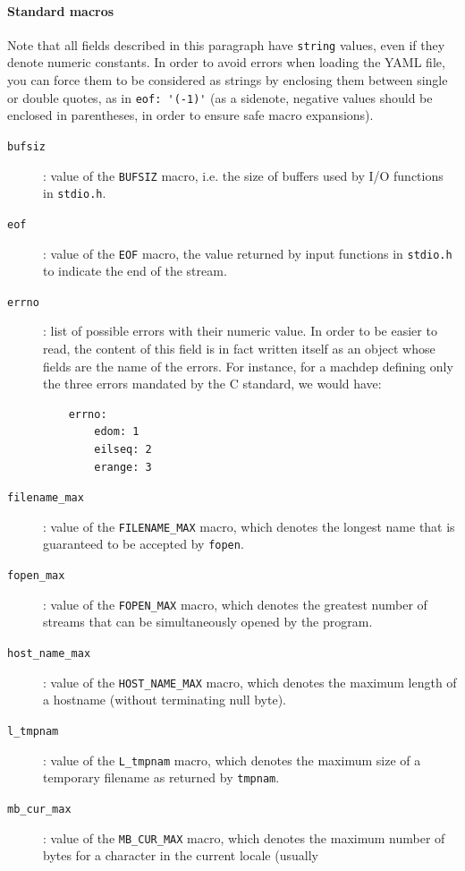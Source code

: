 \paragraph{Standard macros}

Note that all fields described in this paragraph have \texttt{string} values,
even if they denote numeric constants. In order to avoid errors when loading the
YAML file, you can force them to be considered as strings by enclosing them between
single or double quotes, as in \verb+eof: '(-1)'+ (as a sidenote, negative values
should be enclosed in parentheses, in order to ensure safe macro expansions).

\begin{description}
  \item[\texttt{bufsiz}]: value of the \texttt{BUFSIZ} macro, i.e. the size
    of buffers used by I/O functions in \texttt{stdio.h}.
  \item[\texttt{eof}]: value of the \texttt{EOF} macro, the value returned by input
    functions in \texttt{stdio.h} to indicate the end of the stream.
  \item[\texttt{errno}]: list of possible errors with their numeric value. In order
    to be easier to read, the content of this field is in fact written itself as an
    object whose fields are the name of the errors. For instance, for a machdep defining
    only the three errors mandated by the C standard, we would have:
    \begin{verbatim}
    errno:
        edom: 1
        eilseq: 2
        erange: 3
    \end{verbatim}
  \item[\texttt{filename\_max}]: value of the \texttt{FILENAME\_MAX} macro, which
    denotes the longest name that is guaranteed to be accepted by \texttt{fopen}.
  \item[\texttt{fopen\_max}]: value of the \texttt{FOPEN\_MAX} macro, which denotes the
    greatest number of streams that can be simultaneously opened by the program.
  \item[\texttt{host\_name\_max}]: value of the \texttt{HOST\_NAME\_MAX} macro, which
    denotes the maximum length of a hostname (without terminating null byte).
  \item[\texttt{l\_tmpnam}]: value of the \texttt{L\_tmpnam} macro, which denotes
    the maximum size of a temporary filename as returned by \texttt{tmpnam}.
  \item[\texttt{mb\_cur\_max}]: value of the \texttt{MB\_CUR\_MAX} macro, which denotes
    the maximum number of bytes for a character in the current locale (usually

\end{description}
